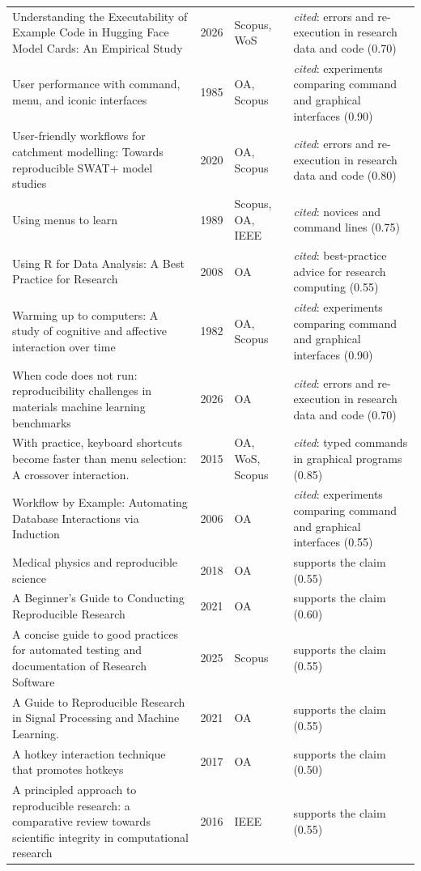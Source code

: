 \begin{longtable}{@{}%
  >{\raggedright\arraybackslash}p{}c%
  >{\raggedright\arraybackslash}p{}%
  >{\raggedright\arraybackslash}p{}@{}}
Understanding the Executability of Example Code in Hugging Face Model Cards: An Empirical Study & 2026 & Scopus, WoS & \emph{cited}: errors and re-execution in research data and code (0.70) \\
User performance with command, menu, and iconic interfaces & 1985 & OA, Scopus & \emph{cited}: experiments comparing command and graphical interfaces (0.90) \\
User-friendly workflows for catchment modelling: Towards reproducible SWAT+ model studies & 2020 & OA, Scopus & \emph{cited}: errors and re-execution in research data and code (0.80) \\
Using menus to learn & 1989 & Scopus, OA, IEEE & \emph{cited}: novices and command lines (0.75) \\
Using R for Data Analysis: A Best Practice for Research & 2008 & OA & \emph{cited}: best-practice advice for research computing (0.55) \\
Warming up to computers: A study of cognitive and affective interaction over time & 1982 & OA, Scopus & \emph{cited}: experiments comparing command and graphical interfaces (0.90) \\
When code does not run: reproducibility challenges in materials machine learning benchmarks & 2026 & OA & \emph{cited}: errors and re-execution in research data and code (0.70) \\
With practice, keyboard shortcuts become faster than menu selection: A crossover interaction. & 2015 & OA, WoS, Scopus & \emph{cited}: typed commands in graphical programs (0.85) \\
Workflow by Example: Automating Database Interactions via Induction & 2006 & OA & \emph{cited}: experiments comparing command and graphical interfaces (0.55) \\
67 Medical physics and reproducible science & 2018 & OA & supports the claim (0.55) \\
A Beginner's Guide to Conducting Reproducible Research & 2021 & OA & supports the claim (0.60) \\
A concise guide to good practices for automated testing and documentation of Research Software & 2025 & Scopus & supports the claim (0.55) \\
A Guide to Reproducible Research in Signal Processing and Machine Learning. & 2021 & OA & supports the claim (0.55) \\
A hotkey interaction technique that promotes hotkeys & 2017 & OA & supports the claim (0.50) \\
A principled approach to reproducible research: a comparative review towards scientific integrity in computational research & 2016 & IEEE & supports the claim (0.55) \\

\end{longtable}
